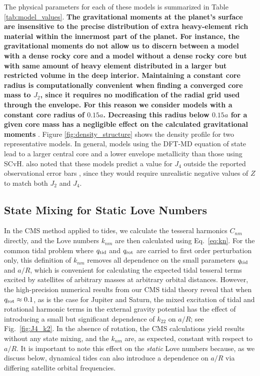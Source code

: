 The physical parameters for each of these models is summarized in Table
\ref{tab:model_values}. {\bf The gravitational moments at the planet's surface are
insensitive to the precise distribution of extra heavy-element rich material within the
innermost part of the planet. For instance, 
the gravitational moments do not allow us to discern between a model
with a dense rocky core and a model without a dense rocky core but with same amount
of heavy element distributed in a larger but restricted volume in the deep interior. 
Maintaining a constant core radius is
computationally convenient when finding a converged core mass to $J_{2}$, since it
requires no modification of the radial grid used through the envelope. For this
reason we consider models with a constant core radius of $0.15a$. Decreasing this
radius below $0.15a$ for a given core mass has a negligible effect on the calculated
gravitational moments } \citep{hubbard2016}. Figure \ref{fig:density_structure} shows
the density profile for two representative models.  In general, models using the
DFT-MD equation of state lead to a larger central core and a lower envelope
metallicity than those using SCvH.  \citet{hubbard2016} also noted that these models
predict a value for $J_4$ outside the reported observational error bars
\citep{jacobson2003}, since they would require unrealistic negative values of $Z$ to
match both $J_2$ and $J_4$.


\subsection{State Mixing for Static Love Numbers} \label{state_mixing}

In the CMS method applied to tides, we calculate the tesseral harmonics $C_{nm}$
directly, and the Love numbers $k_{nm}$ are then calculated using Eq.~\ref{eq:kn}.
For the common tidal problem where $q_{\rm tid}$ and $q_{\rm rot}$ are carried to
first order perturbation only, this definition of $k_{nm}$ removes all dependence on
the small parameters $q_{\rm tid}$ and $a/R$, which is convenient for calculating the
expected tidal tesseral terms excited by satellites of arbitrary masses at arbitrary
orbital distances.  However, the high-precision numerical results from our CMS tidal
theory reveal that when $q_{\rm rot} \approx 0.1$, as is the case for Jupiter and
Saturn, the mixed excitation of tidal and rotational harmonic terms in the external
gravity potential has the effect of introducing a small but significant dependence of
$k_{22}$ on $a/R$; see Fig.~\ref{fig:J4_k2}. In the absence of rotation, the CMS
calculations yield results without any state mixing, and the $k_{nm}$ are, as
expected, constant with respect to $a/R$.  It is important to note this effect on the
{\it static} Love numbers because, as we discuss below, dynamical tides can also
introduce a dependence on $a/R$ via differing satellite orbital frequencies.

